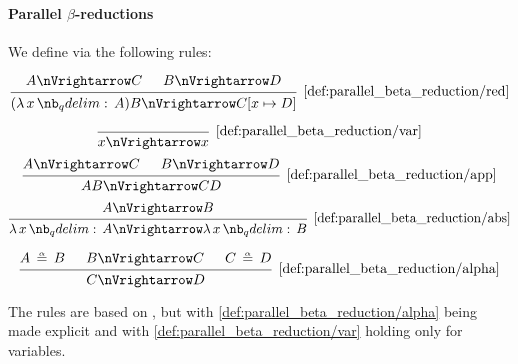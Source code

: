 \paragraph{Parallel \( \beta \)-reductions}

\begin{definition}\label{def:parallel_beta_reduction}
  We define  via the following rules:

  \begin{equation*}\taglabel[\ensuremath{ \logic{Red}_\Vert }]{def:parallel_beta_reduction/red}
    \begin{prooftree}
      \hypo{ A \pred C }
      \hypo{ B \pred D }
      \infer2[\ref{def:parallel_beta_reduction/red}]{ (\qabs x A)B \pred C[x \mapsto D] }
    \end{prooftree}
  \end{equation*}

  \begin{ThreeColumns}
    \begin{equation*}\taglabel[\ensuremath{ \logic{Var}_\Vert }]{def:parallel_beta_reduction/var}
      \begin{prooftree}
        \infer0[\ref{def:parallel_beta_reduction/var}]{ x \pred x }
      \end{prooftree}
    \end{equation*}
  \BeginSecondColumn
    \begin{equation*}\taglabel[\ensuremath{ \logic{App}_\Vert }]{def:parallel_beta_reduction/app}
      \begin{prooftree}
        \hypo{ A \pred C }
        \hypo{ B \pred D }
        \infer2[\ref{def:parallel_beta_reduction/app}]{ AB \pred CD }
      \end{prooftree}
    \end{equation*}
  \BeginThirdColumn
    \begin{equation*}\taglabel[\ensuremath{ \logic{Abs}_\Vert }]{def:parallel_beta_reduction/abs}
      \begin{prooftree}
        \hypo{ A \pred B }
        \infer1[\ref{def:parallel_beta_reduction/abs}]{ \qabs x A \pred \qabs x B }
      \end{prooftree}
    \end{equation*}
  \end{ThreeColumns}

  \begin{equation*}\taglabel[\ensuremath{ \logic{Alpha}_\Vert }]{def:parallel_beta_reduction/alpha}
    \begin{prooftree}
      \hypo{ A \aequiv B }
      \hypo{ B \pred C }
      \hypo{ C \aequiv D }
      \infer3[\ref{def:parallel_beta_reduction/alpha}]{ C \pred D }
    \end{prooftree}
  \end{equation*}
\end{definition}
\begin{comments}
  \item The rules are based on \cite[3.2.3]{Barendregt1984}, but with \ref{def:parallel_beta_reduction/alpha} being made explicit and with \ref{def:parallel_beta_reduction/var} holding only for variables.
\end{comments}

